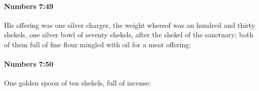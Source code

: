 		\paragraph{Numbers 7:49} %
			\label{NUMBERS-7-49}

			His offering was one silver charger, the weight whereof was an hundred and thirty shekels, one silver bowl of seventy shekels, after the shekel of the sanctuary; both of them full of fine flour mingled with oil for a meat offering:


		\paragraph{Numbers 7:50} %
			\label{NUMBERS-7-50}

			One golden spoon of ten shekels, full of incense:


